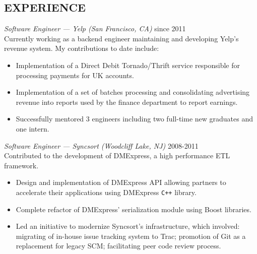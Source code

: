\documentclass[line,margin]{res}
\begin{document}
\address{1335 Clay street, San Francisco, 94109, CA}

\begin{resume}

\section{EXPERIENCE}
                {\sl Software Engineer --- Yelp (San Francisco, CA)} \hfill since 2011 \\
                Currently working as a backend engineer maintaining and developing Yelp's revenue system. My contributions to date include:
                \begin{itemize}  \itemsep -2pt
                    \item Implementation of a Direct Debit Tornado/Thrift service responsible for processing payments for UK accounts.
                    \item Implementation of a set of batches processing and consolidating advertising revenue into reports used by the finance department to report earnings.
                    \item Successfully mentored 3 engineers including two full-time new graduates and one intern.
                \end{itemize}

                {\sl Software Engineer --- Syncsort (Woodcliff Lake, NJ)} \hfill 2008-2011 \\
                Contributed to the development of DMExpress, a high performance ETL framework.
                \begin{itemize}  \itemsep -2pt
                    \item Design and implementation of DMExpress API allowing partners to accelerate their applications using DMExpress \texttt{C++} library.
                    \item Complete refactor of DMExpress' serialization module using Boost libraries.
                    \item Led an initiative to modernize Syncsort's infrastructure, which involved: migrating of in-house issue tracking system to Trac; promotion of Git as a replacement for legacy SCM; facilitating peer code review process.
                \end{itemize}


\end{resume}
\end{document}
